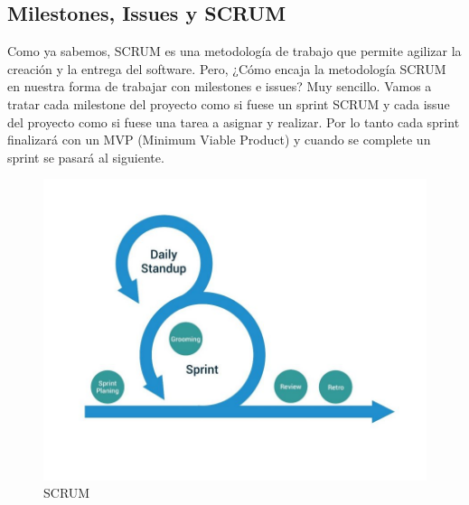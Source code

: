 \subsection{Milestones, Issues y SCRUM}
\begin{text}
	Como ya sabemos, SCRUM es una metodología de trabajo que permite agilizar la creación y la entrega del software. Pero, ¿Cómo encaja la metodología SCRUM en nuestra forma de trabajar con milestones e issues? Muy sencillo. Vamos a tratar cada milestone del proyecto como si fuese un sprint SCRUM y cada issue del proyecto como si fuese una tarea a asignar y realizar. Por lo tanto cada sprint finalizará con un MVP (Minimum Viable Product) y cuando se complete un sprint se pasará al siguiente.
	
	\begin{figure}[!hbt]
		\centering
		\includegraphics[scale=0.5]{imagenes/Planificacion/scrum.jpg}
		\caption[SCRUM]{SCRUM \cite{scrum:online}}
		\label{scrum_plan}
	\end{figure}
	\clearpage
	

\end{text}
